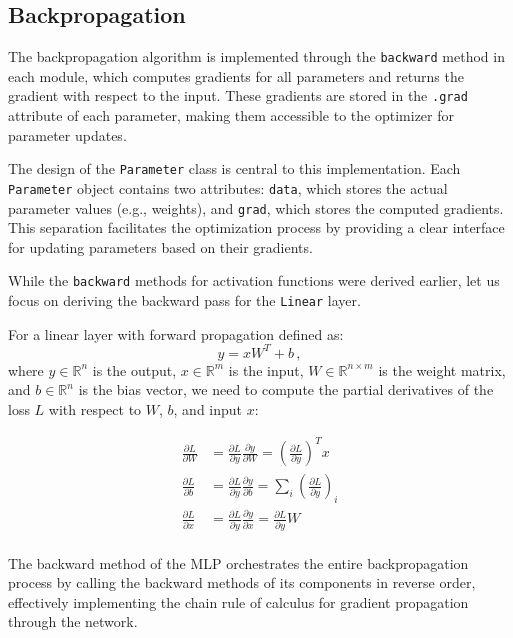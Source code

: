 \documentclass[twocolumn]{extarticle}
\begin{document}
\subsection{Backpropagation}

The backpropagation algorithm is implemented through the \texttt{backward} method in each module, which computes gradients for all parameters and returns the gradient with respect to the input. These gradients are stored in the \texttt{.grad} attribute of each parameter, making them accessible to the optimizer for parameter updates.

The design of the \texttt{Parameter} class is central to this implementation. Each \texttt{Parameter} object contains two attributes: \texttt{data}, which stores the actual parameter values (e.g., weights), and \texttt{grad}, which stores the computed gradients. This separation facilitates the optimization process by providing a clear interface for updating parameters based on their gradients.

While the \texttt{backward} methods for activation functions were derived earlier, let us focus on deriving the backward pass for the \texttt{Linear} layer.

For a linear layer with forward propagation defined as:
\begin{equation}
y = x W^T + b \, ,
\end{equation}
where $y\in\mathbb{R}^n$ is the output, $x\in \mathbb{R}^m$ is the input, $W \in \mathbb{R}^{n \times m}$ is the weight matrix, and $b \in \mathbb{R}^n$ is the bias vector, we need to compute the partial derivatives of the loss $L$ with respect to $W$, $b$, and input $x$:

\begin{align}
\frac{\partial L}{\partial W} &= \frac{\partial L}{\partial y} \frac{\partial y}{\partial W} =  \left(\frac{\partial L}{\partial y}\right)^T x \\
\frac{\partial L}{\partial b} &= \frac{\partial L}{\partial y} \frac{\partial y}{\partial b} = \sum_i \left(\frac{\partial L}{\partial y}\right)_i \\
\frac{\partial L}{\partial x} &= \frac{\partial L}{\partial y} \frac{\partial y}{\partial x} = \frac{\partial L}{\partial y} W \\
\end{align}

The backward method of the MLP orchestrates the entire backpropagation process by calling the backward methods of its components in reverse order, effectively implementing the chain rule of calculus for gradient propagation through the network.
\end{document}
